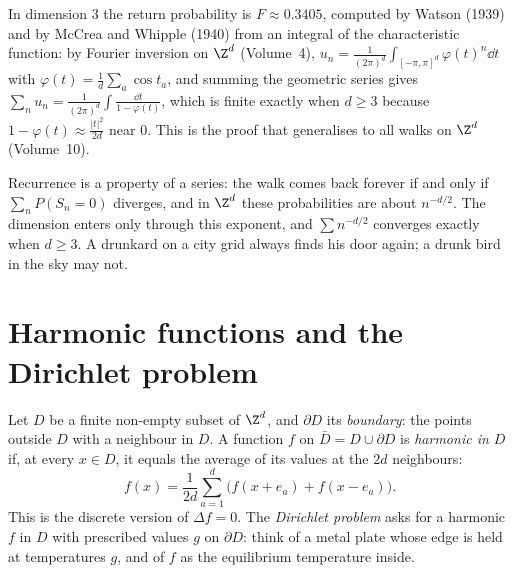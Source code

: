 \begin{remark}
In dimension $3$ the return probability is $F\approx0.3405$, computed by Watson (1939) and by McCrea and Whipple (1940)
from an integral of the characteristic function: by Fourier inversion on $\Z^d$ (Volume~4), $u_n=\frac1{(2\pi)^d}\int_{[-\pi,\pi]^d}\varphi(t)^n\dd t$
with $\varphi(t)=\frac1d\sum_a\cos t_a$, and summing the geometric series gives $\sum_nu_n=\frac1{(2\pi)^d}\int\frac{\dd t}{1-\varphi(t)}$, which is finite exactly
when $d\ge3$ because $1-\varphi(t)\approx\frac{|t|^2}{2d}$ near $0$. This is the proof that generalises to all walks on $\Z^d$ (Volume~10).
\end{remark}

\begin{beauty}
Recurrence is a property of a series: the walk comes back forever if and only if $\sum_nP(S_n=0)$ diverges, and in $\Z^d$
these probabilities are about $n^{-d/2}$. The dimension enters only through this exponent, and $\sum n^{-d/2}$ converges exactly
when $d\ge3$. A drunkard on a city grid always finds his door again; a drunk bird in the sky may not.
\end{beauty}

\section{Harmonic functions and the Dirichlet problem}

Let $D$ be a finite non-empty subset of $\Z^d$, and $\partial D$ its \emph{boundary}: the points outside $D$ with a neighbour in $D$. A
function $f$ on $\bar D=D\cup\partial D$ is \emph{harmonic in $D$} if, at every $x\in D$, it equals the average of its values at the $2d$ neighbours:
\[
f(x)=\frac1{2d}\sum_{a=1}^d\bigl(f(x+e_a)+f(x-e_a)\bigr).
\]
This is the discrete version of $\Delta f=0$. The \emph{Dirichlet problem} asks for a harmonic $f$ in $D$ with prescribed values $g$ on $\partial D$:
think of a metal plate whose edge is held at temperatures $g$, and of $f$ as the equilibrium temperature inside.

